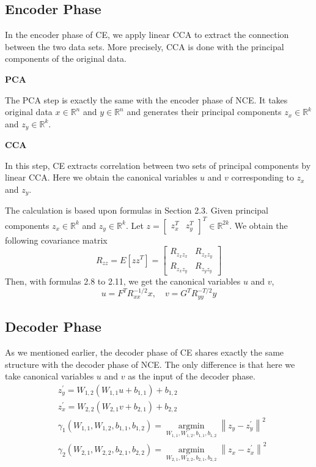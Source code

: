 \documentclass[12pt]{report} %
\newcommand{\norm}[1]{\left\lVert #1 \right\rVert}
\begin{document}
\subsection{Encoder Phase}
In the encoder phase of CE, we apply linear CCA to extract the connection between the two data sets. More precisely, CCA is done with the principal components of the original data.

\textbf{PCA}

The PCA step is exactly the same with the encoder phase of NCE. It takes original data $x\in \mathbb{R}^{n}$ and $y\in \mathbb{R}^{n}$ and generates their principal components $z_x\in \mathbb{R}^{k}$ and $z_y\in \mathbb{R}^{k}$.

\textbf{CCA}

In this step, CE extracts correlation between two sets of principal components by linear CCA. Here we obtain the canonical variables $u$ and $v$ corresponding to $z_x$ and $z_y$. 

The calculation is based upon formulas in Section 2.3. Given principal components $z_x\in \mathbb{R}^{k}$ and $z_y\in \mathbb{R}^{k}$. Let $z= \begin{bmatrix}z_x^T & z_y^T\end{bmatrix}^T \in \mathbb{R}^{2k}$. We obtain the following covariance matrix
\begin{equation}
R_{zz}=E[zz^T]=\begin{bmatrix}
R_{z_{x}z_{x}} & R_{z_{x}z_{y}} \\
R_{z_{x}z_{y}} & R_{z_{y}z_{y}}
\end{bmatrix}
\end{equation}
Then, with formulas 2.8 to 2.11, we get the canonical variables $u$ and $v$,
\begin{equation}
u=F^TR_{xx}^{-1/2}x,\quad v=G^TR_{yy}^{-T/2}y
\end{equation}

\subsection{Decoder Phase}
As we mentioned earlier, the decoder phase of CE shares exactly the same structure with the decoder phase of NCE. The only difference is that here we take canonical variables $u$ and $v$ as the input of the decoder phase. 
\begin{equation}
\begin{split}
&z_y^{'}=W_{1,2}(W_{1,1}u+b_{1,1})+b_{1,2} \\
&z_x^{'}=W_{2,2}(W_{2,1}v+b_{2,1})+b_{2,2} \\
&\gamma_1(W_{1,1},W_{1,2},b_{1,1},b_{1,2})=\operatorname*{argmin}_{W_{1,1},W_{1,2},b_{1,1},b_{1,2}}\norm{z_y-z_y^{'}}^2 \\
&\gamma_2(W_{2,1},W_{2,2},b_{2,1},b_{2,2})=\operatorname*{argmin}_{W_{2,1},W_{2,2},b_{2,1},b_{2,2}}\norm{z_x-z_x^{'}}^2
\end{split}
\end{equation}
\end{document}
